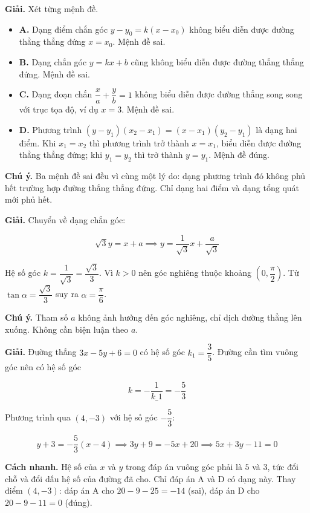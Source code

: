 \documentclass[11pt, a4paper]{article}
\begin{document}
\begin{dapan}[3 — Đáp án D]
\textbf{Giải.} Xét từng mệnh đề.

\begin{itemize}[leftmargin=1.4em, itemsep=2pt]
\item \textbf{A.} Dạng điểm chắn góc $y - y_0 = k(x - x_0)$ không biểu diễn được đường thẳng thẳng đứng $x = x_0$. Mệnh đề sai.
\item \textbf{B.} Dạng chắn góc $y = kx + b$ cũng không biểu diễn được đường thẳng thẳng đứng. Mệnh đề sai.
\item \textbf{C.} Dạng đoạn chắn $\dfrac{x}{a} + \dfrac{y}{b} = 1$ không biểu diễn được đường thẳng song song với trục tọa độ, ví dụ $x = 3$. Mệnh đề sai.
\item \textbf{D.} Phương trình $(y - y_1)(x_2 - x_1) = (x - x_1)(y_2 - y_1)$ là dạng hai điểm. Khi $x_1 = x_2$ thì phương trình trở thành $x = x_1$, biểu diễn được đường thẳng thẳng đứng; khi $y_1 = y_2$ thì trở thành $y = y_1$. Mệnh đề đúng.
\end{itemize}


\textbf{Chú ý.} Ba mệnh đề sai đều vì cùng một lý do: dạng phương trình đó không phủ hết trường hợp đường thẳng thẳng đứng. Chỉ dạng hai điểm và dạng tổng quát mới phủ hết.
\end{dapan}

\begin{dapan}[4 — Đáp án A]
\textbf{Giải.} Chuyển về dạng chắn góc:

$$\sqrt{3}y = x + a \implies y = \frac{1}{\sqrt{3}}x + \frac{a}{\sqrt{3}}$$

Hệ số góc $k = \dfrac{1}{\sqrt{3}} = \dfrac{\sqrt{3}}{3}$. Vì $k > 0$ nên góc nghiêng thuộc khoảng $\left(0, \dfrac{\pi}{2}\right)$. Từ $\tan\alpha = \dfrac{\sqrt{3}}{3}$ suy ra $\alpha = \dfrac{\pi}{6}$.

\textbf{Chú ý.} Tham số $a$ không ảnh hưởng đến góc nghiêng, chỉ dịch đường thẳng lên xuống. Không cần biện luận theo $a$.
\end{dapan}

\begin{dapan}[5 — Đáp án D]
\textbf{Giải.} Đường thẳng $3x - 5y + 6 = 0$ có hệ số góc $k_1 = \dfrac{3}{5}$. Đường cần tìm vuông góc nên có hệ số góc

$$k = -\frac{1}{k\_1} = -\frac{5}{3}$$

Phương trình qua $(4, -3)$ với hệ số góc $-\dfrac{5}{3}$:

$$y + 3 = -\frac{5}{3}(x - 4) \implies 3y + 9 = -5x + 20 \implies 5x + 3y - 11 = 0$$

\textbf{Cách nhanh.} Hệ số của $x$ và $y$ trong đáp án vuông góc phải là $5$ và $3$, tức đổi chỗ và đổi dấu hệ số của đường đã cho. Chỉ đáp án A và D có dạng này. Thay điểm $(4,-3)$: đáp án A cho $20 - 9 - 25 = -14$ (sai), đáp án D cho $20 - 9 - 11 = 0$ (đúng).
\end{dapan}
\end{document}
